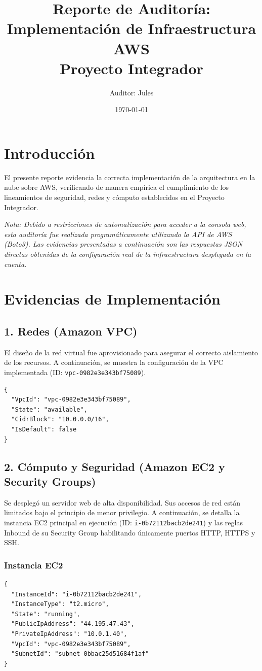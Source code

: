 \documentclass[12pt,a4paper]{article}
\title{\textbf{Reporte de Auditoría: Implementación de Infraestructura AWS}\\Proyecto Integrador}
\author{Auditor: Jules}
\date{\today}
\begin{document}
\maketitle

\section{Introducción}
El presente reporte evidencia la correcta implementación de la arquitectura en la nube sobre AWS, verificando de manera empírica el cumplimiento de los lineamientos de seguridad, redes y cómputo establecidos en el Proyecto Integrador.

\textit{Nota: Debido a restricciones de automatización para acceder a la consola web, esta auditoría fue realizada programáticamente utilizando la API de AWS (Boto3). Las evidencias presentadas a continuación son las respuestas JSON directas obtenidas de la configuración real de la infraestructura desplegada en la cuenta.}

\section{Evidencias de Implementación}

\subsection{1. Redes (Amazon VPC)}
El diseño de la red virtual fue aprovisionado para asegurar el correcto aislamiento de los recursos. A continuación, se muestra la configuración de la VPC implementada (ID: \texttt{vpc-0982e3e343bf75089}).

\begin{verbatim}
{
  "VpcId": "vpc-0982e3e343bf75089",
  "State": "available",
  "CidrBlock": "10.0.0.0/16",
  "IsDefault": false
}
\end{verbatim}

\subsection{2. Cómputo y Seguridad (Amazon EC2 y Security Groups)}
Se desplegó un servidor web de alta disponibilidad. Sus accesos de red están limitados bajo el principio de menor privilegio. A continuación, se detalla la instancia EC2 principal en ejecución (ID: \texttt{i-0b72112bacb2de241}) y las reglas Inbound de su Security Group habilitando únicamente puertos HTTP, HTTPS y SSH.

\subsubsection{Instancia EC2}
\begin{verbatim}
{
  "InstanceId": "i-0b72112bacb2de241",
  "InstanceType": "t2.micro",
  "State": "running",
  "PublicIpAddress": "44.195.47.43",
  "PrivateIpAddress": "10.0.1.40",
  "VpcId": "vpc-0982e3e343bf75089",
  "SubnetId": "subnet-0bbac25d51684f1af"
}
\end{verbatim}
\end{document}
